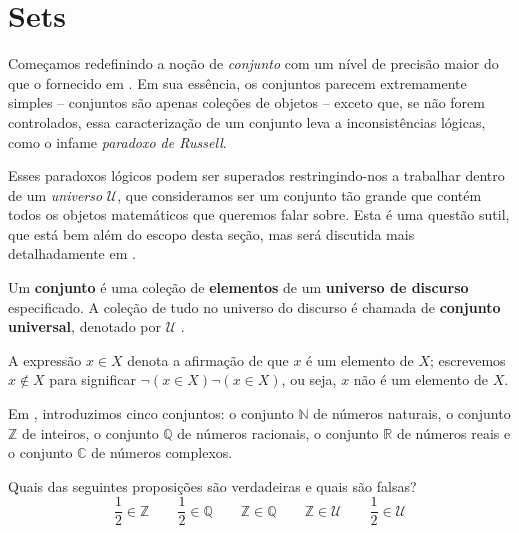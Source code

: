 \section{Sets}

Começamos redefinindo a noção de \textit{conjunto} com um nível de precisão maior do que o fornecido em . Em sua essência, os conjuntos parecem extremamente simples – conjuntos são apenas coleções de objetos – exceto que, se não forem controlados, essa caracterização de um conjunto leva a inconsistências lógicas, como o infame \textit{paradoxo de Russell}.

Esses paradoxos lógicos podem ser superados restringindo-nos a trabalhar dentro de um \textit{universo} $\mathcal{U}$, que consideramos ser um conjunto tão grande que contém todos os objetos matemáticos que queremos falar sobre. Esta é uma questão sutil, que está bem além do escopo desta seção, mas será discutida mais detalhadamente em .

\begin{definition}
\label{defSet}
Um \textbf{conjunto} é uma coleção de \textbf{elementos} de um \textbf{universo de discurso} especificado. A coleção de tudo no universo do discurso é chamada de \textbf{conjunto universal}, denotado por $\mathcal{U}$ .

A expressão $x \in X$  denota a afirmação de que $x$ é um elemento de $X$; escrevemos $x \not \in X$  para significar $\neg (x \in X)\neg (x \in X)$, ou seja, $x$ não é um elemento de $X$.
\end{definition}

\begin{example}
Em , introduzimos cinco conjuntos: o conjunto $\mathbb{N}$ de números naturais, o conjunto $\mathbb{Z}$ de inteiros, o conjunto $\mathbb{Q}$ de números racionais, o conjunto $\mathbb{R}$ de números reais e o conjunto $\mathbb{C}$ de números complexos.
\end{example}

\begin{exercise}
Quais das seguintes proposições são verdadeiras e quais são falsas?
\[ \frac{1}{2} \in \mathbb{Z} \qquad \frac{1}{2} \in \mathbb{Q} \qquad \mathbb{Z} \in \mathbb{Q} \qquad \mathbb{Z} \in \mathcal{U} \qquad \frac{1}{2} \in \mathcal{U} \] 
\end{exercise}

